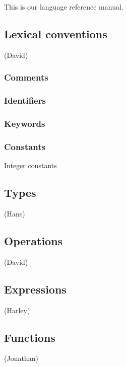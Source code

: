 This is our language reference manual. 

\subsection{Lexical conventions}

(David)

\subsubsection{Comments}

\subsubsection{Identifiers}

\subsubsection{Keywords}

\subsubsection{Constants}
Integer constants

\subsection{Types}

(Hans)

\subsection{Operations}

(David)

\subsection{Expressions}

(Harley)

\subsection{Functions}

(Jonathan)